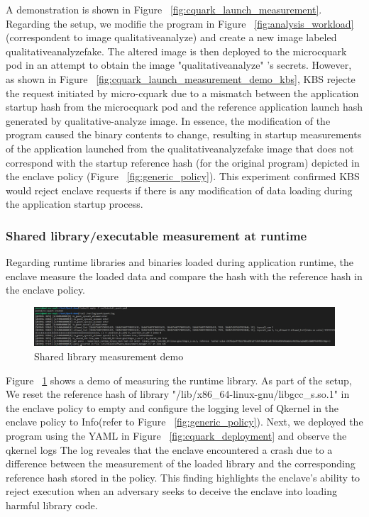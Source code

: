 A demonstration is shown in Figure ~\ref{fig:cquark_launch_measurement}. Regarding the setup, we modifie the program\cite*{qualitativ_workload} in Figure ~\ref{fig:analysis_workload} (correspondent to image qualitative\-analyze) and create a new image labeled qualitative\-analyze\-fake. 
The altered image is then deployed to the micro\-cquark pod in an attempt to obtain the image "qualitative\-analyze" 's secrets. However, as shown in Figure ~\ref{fig:cquark_launch_measurement_demo_kbs}, KBS rejecte the request initiated by micro-cquark due to a mismatch between the 
application startup hash from the micro\-cquark pod and the reference application launch hash generated by qualitative-analyze image. In essence, the modification of the program caused the binary contents to change, resulting in startup measurements of the application launched from the 
 qualitative\-analyze\-fake image that does not correspond with the startup reference hash (for the original program) depicted in the enclave policy (Figure ~\ref{fig:generic_policy}). This experiment confirmed KBS would reject enclave requests if there is any modification 
 of data loading during the application startup process.


\subsubsection{Shared library/executable measurement at runtime}
Regarding runtime libraries and binaries loaded during application runtime, the enclave  measure the loaded data and compare the hash with the  reference hash in the enclave policy.

\begin{figure}[H]
    \centering
    \includegraphics[width=1\textwidth]{images/cquark_runtime_runtime_lib_measurement_demo.png}
    \caption[Shared library measurement demo]{Shared library measurement demo}
    \label{fig:cquark_runtime_runtime_lib_measurement_demo}
\end{figure}

Figure ~\ref{fig:cquark_runtime_runtime_lib_measurement_demo} shows a demo of measuring the runtime library. As part of the setup, We reset the reference hash of  library "/lib/x86\_64-linux-gnu/libgcc\_s.so.1" in the enclave policy to empty and 
configure the logging level of Qkernel in the enclave policy to Info(refer to Figure ~\ref{fig:generic_policy}). Next, we deployed the program using the YAML in Figure ~\ref{fig:cquark_deployment} and observe the qkernel logs  The log reveales that the enclave encountered 
a crash due to a difference between the measurement of the loaded library and the corresponding reference hash stored in the policy. This finding highlights the enclave's ability to reject execution when an adversary seeks to deceive the enclave 
into loading harmful library code.

